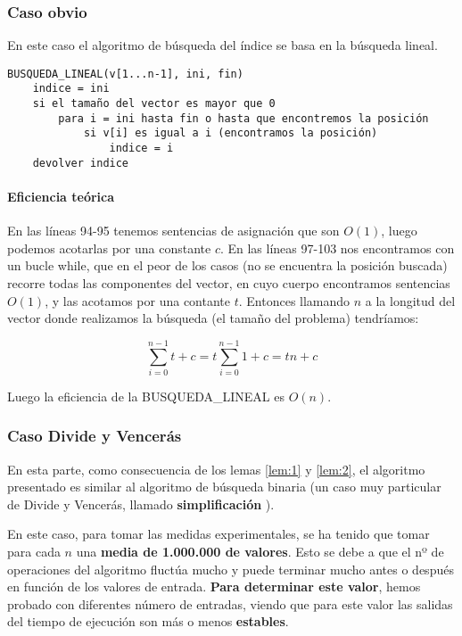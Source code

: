 \subsubsection{Caso obvio}

En este caso el algoritmo de búsqueda del índice se basa en la búsqueda lineal. 

\begin{lstlisting}
BUSQUEDA_LINEAL(v[1...n-1], ini, fin)
    indice = ini
    si el tamaño del vector es mayor que 0
        para i = ini hasta fin o hasta que encontremos la posición
            si v[i] es igual a i (encontramos la posición)
                indice = i
    devolver indice
\end{lstlisting}

 

\paragraph{Eficiencia teórica}

En las líneas 94-95 tenemos sentencias de asignación que son $O(1)$, luego podemos acotarlas por una constante $c$. 
En las líneas 97-103 nos encontramos con un bucle while, que en el peor de los casos (no se encuentra la posición buscada) 
recorre todas las componentes del vector, en cuyo cuerpo encontramos sentencias $O(1)$, y las acotamos por una contante $t$.
Entonces llamando $n$ a la longitud del vector donde realizamos la búsqueda (el tamaño del problema) tendríamos: 

\begin{equation*}
    \sum_{i=0}^{n-1} t + c = t \sum_{i=0}^{n-1} 1 + c = tn + c
\end{equation*}

Luego la eficiencia de la BUSQUEDA\_LINEAL es $O(n)$.

\subsubsection{Caso Divide y Vencerás}

En esta parte, como consecuencia de los lemas \ref{lem:1} y \ref{lem:2}, el algoritmo presentado es similar 
al algoritmo de búsqueda binaria (un caso muy particular de Divide y Vencerás, 
llamado \textbf{simplificación} \cite{Verdegay2017}).

En este caso, para tomar las medidas experimentales, se ha tenido que tomar para cada $n$ una \textbf{media de 1.000.000
de valores}. Esto se debe a que el nº de operaciones del algoritmo fluctúa mucho y puede terminar mucho antes o después en función
de los valores de entrada. \textbf{Para determinar este valor}, hemos probado con diferentes número de entradas, 
viendo que para este valor las salidas del tiempo de ejecución son más o menos \textbf{estables}. 

